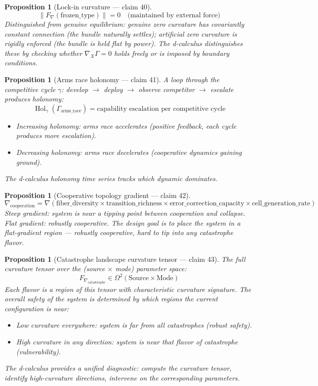 \documentclass[11pt,a4paper]{article}
\newtheorem{proposition}[definition]{Proposition}
\begin{document}
\begin{proposition}[Lock-in curvature --- claim 40]
\label{prop:lockin_curv}
\[
  \|F_\nabla(\text{frozen\_type})\| = 0 \quad \text{(maintained by
    external force)}
\]
Distinguished from genuine equilibrium: genuine zero curvature has
covariantly constant connection (the bundle naturally settles);
artificial zero curvature is rigidly enforced (the bundle is held
flat by power). The d-calculus distinguishes these by checking whether
$\nabla_X \Gamma = 0$ holds freely or is imposed by boundary conditions.
\end{proposition}

\begin{proposition}[Arms race holonomy --- claim 41]
\label{prop:arms_hol}
A loop through the competitive cycle $\gamma$: develop $\to$ deploy
$\to$ observe competitor $\to$ escalate produces holonomy:
\[
  \operatorname{Hol}_\gamma(\Gamma_{\text{arms\_race}}) =
    \text{capability escalation per competitive cycle}
\]
\begin{itemize}
  \item Increasing holonomy: arms race accelerates (positive feedback,
    each cycle produces more escalation).
  \item Decreasing holonomy: arms race decelerates (cooperative dynamics
    gaining ground).
\end{itemize}
The d-calculus holonomy time series tracks which dynamic dominates.
\end{proposition}

\begin{proposition}[Cooperative topology gradient --- claim 42]
\label{prop:coop_grad}
\[
  \nabla_{\text{cooperation}} = \nabla\left(\text{fiber\_diversity}
    \times \text{transition\_richness} \times
    \text{error\_correction\_capacity} \times
    \text{cell\_generation\_rate}\right)
\]
Steep gradient: system is near a tipping point between cooperation
and collapse. Flat gradient: robustly cooperative. The design goal
is to place the system in a flat-gradient region --- robustly
cooperative, hard to tip into any catastrophe flavor.
\end{proposition}

\begin{proposition}[Catastrophe landscape curvature tensor --- claim 43]
\label{prop:landscape}
The full curvature tensor over the (source $\times$ mode) parameter
space:
\[
  F_{\nabla_{\text{catastrophe}}} \in \Omega^2(\text{Source} \times
    \text{Mode})
\]
Each flavor is a region of this tensor with characteristic curvature
signature. The overall safety of the system is determined by which
regions the current configuration is near:
\begin{itemize}
  \item Low curvature everywhere: system is far from all catastrophes
    (robust safety).
  \item High curvature in any direction: system is near that flavor
    of catastrophe (vulnerability).
\end{itemize}
The d-calculus provides a unified diagnostic: compute the curvature
tensor, identify high-curvature directions, intervene on the
corresponding parameters.
\end{proposition}
\end{document}
